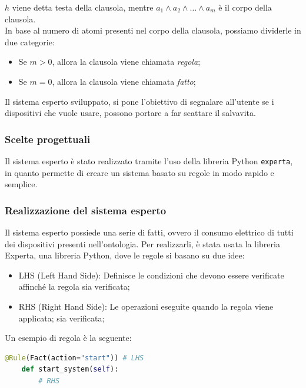 \documentclass[12pt, letterpaper]{article}
\begin{document}
\noindent $h$ viene detta testa della clausola, mentre
$a_1 \land  a_2 \land \dots \land a_m$ è il corpo della clausola. \\

\noindent In base al numero di atomi presenti nel corpo della clausola, possiamo dividerle in due categorie:
\begin{itemize}
      \item Se $m > 0$, allora la clausola viene chiamata \textit{regola};
      \item Se $m = 0$, allora la clausola viene chiamata \textit{fatto};
\end{itemize}

\noindent Il sistema esperto sviluppato, si pone l'obiettivo di segnalare all'utente
se i dispositivi che vuole usare, possono portare a far scattare il salvavita. \\

\subsubsection{Scelte progettuali}

Il sistema esperto è stato realizzato tramite l'uso della libreria Python \texttt{experta}, in
quanto permette di creare un sistema basato su regole in modo rapido e semplice.

\subsubsection{Realizzazione del sistema esperto}

Il sistema esperto possiede una serie di fatti, ovvero il consumo elettrico di tutti dei dispositivi
presenti nell'ontologia. Per realizzarli, è stata usata la libreria Experta, una libreria Python, dove le regole
si basano su due idee:

\begin{itemize}
      \item LHS (Left Hand Side): Definisce le condizioni che devono essere verificate affinché la regola
            sia verificata;
      \item RHS (Right Hand Side): Le operazioni eseguite quando la regola viene applicata;
            sia verificata;
\end{itemize}

\noindent Un esempio di regola è la seguente:

\begin{lstlisting}[language=Python]
    @Rule(Fact(action="start")) # LHS
    def start_system(self):
        # RHS
\end{lstlisting}
\end{document}
